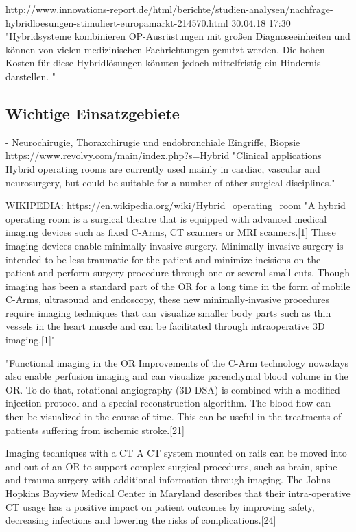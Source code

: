 http://www.innovations-report.de/html/berichte/studien-analysen/nachfrage-hybridloesungen-stimuliert-europamarkt-214570.html 30.04.18 17:30	
	"Hybridsysteme kombinieren OP-Ausrüstungen mit großen Diagnoseeinheiten und können von vielen medizinischen Fachrichtungen genutzt werden. Die hohen Kosten für diese Hybridlösungen könnten jedoch mittelfristig ein Hindernis darstellen. "
\subsection{Wichtige Einsatzgebiete}
- Neurochirugie, Thoraxchirugie und endobronchiale Eingriffe, Biopsie
	https://www.revolvy.com/main/index.php?s=Hybrid%
	"Clinical applications
	Hybrid operating rooms are currently used mainly in cardiac, vascular and neurosurgery, but could be suitable for a number of other surgical disciplines."

WIKIPEDIA: https://en.wikipedia.org/wiki/Hybrid_operating_room
	"A hybrid operating room is a surgical theatre that is equipped with advanced medical imaging devices such as fixed C-Arms, CT scanners or MRI scanners.[1] These imaging devices enable minimally-invasive surgery. Minimally-invasive surgery is intended to be less traumatic for the patient and minimize incisions on the patient and perform surgery procedure through one or several small cuts.
	Though imaging has been a standard part of the OR for a long time in the form of mobile C-Arms, ultrasound and endoscopy, these new minimally-invasive procedures require imaging techniques that can visualize smaller body parts such as thin vessels in the heart muscle and can be facilitated through intraoperative 3D imaging.[1]"
	
	"Functional imaging in the OR
	Improvements of the C-Arm technology nowadays also enable perfusion imaging and can visualize parenchymal blood volume in the OR. To do that, rotational angiography (3D-DSA) is combined with a modified injection protocol and a special reconstruction algorithm. The blood flow can then be visualized in the course of time. This can be useful in the treatments of patients suffering from ischemic stroke.[21]
	
	Imaging techniques with a CT
	A CT system mounted on rails can be moved into and out of an OR to support complex surgical procedures, such as brain, spine and trauma surgery with additional information through imaging. The Johns Hopkins Bayview Medical Center in Maryland describes that their intra-operative CT usage has a positive impact on patient outcomes by improving safety, decreasing infections and lowering the risks of complications.[24]
	

